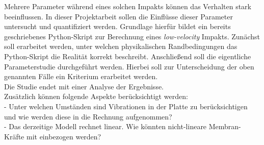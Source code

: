 Mehrere Parameter während eines solchen Impakts können das Verhalten stark beeinflussen. In dieser Projektarbeit sollen die Einflüsse dieser Parameter untersucht und quantifiziert werden. Grundlage hierfür bildet ein bereits geschriebenes Python-Skript zur Berechnung eines \textit{low-velocity} Impakts. Zunächst soll erarbeitet werden, unter welchen physikalischen Randbedingungen das Python-Skript die Realität korrekt beschreibt. Anschließend soll die eigentliche Parameterstudie durchgeführt werden. Hierbei soll zur Unterscheidung der oben genannten Fälle ein Kriterium erarbeitet werden.\\ Die Studie endet mit einer Analyse der Ergebnisse.\\
Zusätzlich können folgende Aspekte berücksichtigt werden: \\
- Unter welchen Umständen sind Vibrationen in der Platte zu berücksichtigen und wie werden diese in die Rechnung aufgenommen?\\
- Das derzeitige Modell rechnet linear. Wie könnten nicht-lineare Membran-Kräfte mit einbezogen werden?\\
	

